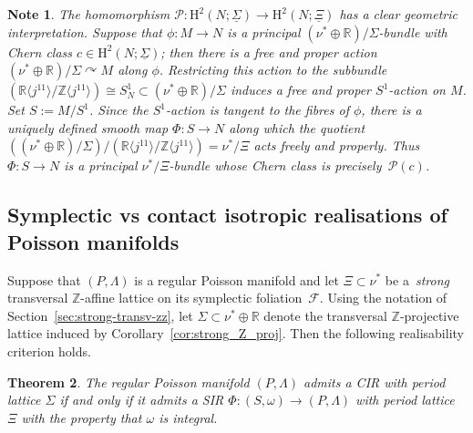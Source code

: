 \documentclass[pdftex]{sigma}
\numberwithin{equation}{section}
\newtheorem{Theorem}{Theorem}[section]
\newtheorem{Note}[Theorem]{Note}
\newcommand{\SM}{(S,\omega)} %
\newcommand{\PM}{(P,\Lambda)} %
\newcommand{\HH}{\mathrm{H}}
\newcommand{\RR}{\mathbb{R}}
\newcommand{\ZZ}{\mathbb{Z}}
\begin{document}
\begin{Note}\label{obs:geom_inter_P}
The homomorphism $\mathcal{P} \colon \HH^2(N;\underline{\Sigma}) \to \HH^2(N;\underline{\Xi})$ has a clear geometric interpretation. Suppose that $\phi \colon M \to N$ is a principal $(\nu^* \oplus \RR)/\Sigma$-bundle with Chern class $c \in \HH^2(N;\underline{\Sigma})$; then there is a free and proper action $(\nu^* \oplus \RR)/\Sigma \curvearrowright M$ along $\phi$. Restricting this action to the subbundle $(\RR \langle j^11\rangle/ \ZZ \langle j^11 \rangle ) \cong S^1_N \subset (\nu^* \oplus \RR)/\Sigma$ induces a free and proper $S^1$-action on $M$. Set $S:=M/S^1$. Since the $S^1$-action is tangent to the f\/ibres of $\phi$, there is a uniquely def\/ined smooth map $\Phi \colon S \to N$ along which the quotient $((\nu^* \oplus \RR)/\Sigma)/(\RR \langle j^11\rangle/ \ZZ \langle j^11 \rangle ) = \nu^*/\Xi$ acts freely and properly. Thus $\Phi \colon S \to N$ is a principal $\nu^*/\Xi$-bundle whose Chern class is precisely~$\mathcal{P}(c)$.
\end{Note}

\subsection{Symplectic vs contact isotropic realisations of Poisson manifolds}\label{sec:sympl-vs-cont}
Suppose that $\PM$ is a regular Poisson manifold and let $\Xi \subset \nu^*$ be a~{\it strong} transversal $\ZZ$-af\/f\/ine lattice on its symplectic foliation~$\mathcal{F}$. Using the notation of Section~\ref{sec:strong-transv-zz}, let $\Sigma \subset \nu^*\oplus \RR$ denote the transversal $\ZZ$-projective lattice induced by Corollary~\ref{cor:strong_Z_proj}. Then the following realisability criterion holds.

\begin{Theorem}\label{thm:cir_vs_sir}
The regular Poisson manifold $\PM$ admits a CIR with period lattice $\Sigma$ if and only if it admits a SIR $\Phi \colon \SM \to \PM$ with period lattice~$\Xi$ with the property that $\omega$ is integral.
\end{Theorem}
\end{document}
